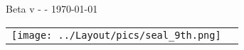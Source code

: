
\begin{titlepage}
\begin{center}

\ifdef{\booktitle}{}{\newcommand{\booktitle}{Missing title}}
\ifdef{\version}{}{\newcommand{\version}{Missing version}}

{\antiquefont\fontsize{40}{48}\selectfont\noindent{}

}

\vspace*{0.5cm}

\vspace*{-1cm}
{\antiquefont\fontsize{50}{60}\selectfont \booktitle
\vspace{0.4cm}

\fontsize{14}{16.8}\selectfont Beta v\version{} - \FAQversion{} - \today{}}

\vfill

\begin{tabular}{@{}m{2cm}@{\hskip 20pt}m{13cm}@{}}
\texttt{[image: ../Layout/pics/seal\_9th.png]} &
{\fontsize{10}{12}\selectfont \textcolor{black!50}{\noindent{}}}

\ifdef{\frontpageaddstuff}{{\fontsize{10}{12}\selectfont \noindent\textcolor{black!50}{\frontpageaddstuff}}}{}

\vspace*{10pt}
\noindent{\fontsize{10}{12}\selectfont \textcolor{black!50}{\labels@license}}
\tabularnewline
\end{tabular}


\end{center}


\end{titlepage}

\restoregeometry